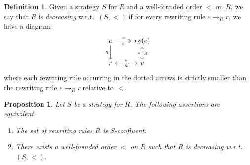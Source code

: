 \documentclass[10pt]{easychair}
\newtheorem{proposition}[theorem]{Proposition}
\theoremstyle{definition}
\newtheorem{definition}[theorem]{Definition}
\newcommand\rewR{\to_R}
\begin{document}
\begin{definition}\label{def:decreasing}
  Given a strategy $S$ for $R$ and a well-founded order $<$ on $R$,
  we say that $R$ is {\em decreasing} w.r.t.\ $(S,<)$ if for every
  rewriting rule $e\rewR r$, we have a diagram:
  \[\begin{tikzcd}
      e\ar[d, "_R"']\ar[r, twoheadrightarrow, "=", "_S"'] &
      r_S(e)\ar[d, leftrightarrow, dotted, "*"', "_R"]\\
      r\ar[r, leftrightarrow, dotted, "*", "_R"'] & v
    \end{tikzcd}\]
  where each rewriting rule occurring in the dotted arrows is strictly
  smaller than the rewriting rule $e\rewR r$ relative to $<$.
\end{definition}
\smallskip

\begin{proposition}\label{prop:S-conf_decreasing}
  Let $S$ be a strategy for $R$. The following assertions are equivalent.
  \begin{enumerate}
  \item The set of rewriting rules $R$ is $S$-confluent.
  \item There exists a well-founded order $<$ on $R$ such that $R$ is
    decreasing w.r.t.\ $(S,<)$.
  \end{enumerate}
\end{proposition}
\end{document}

